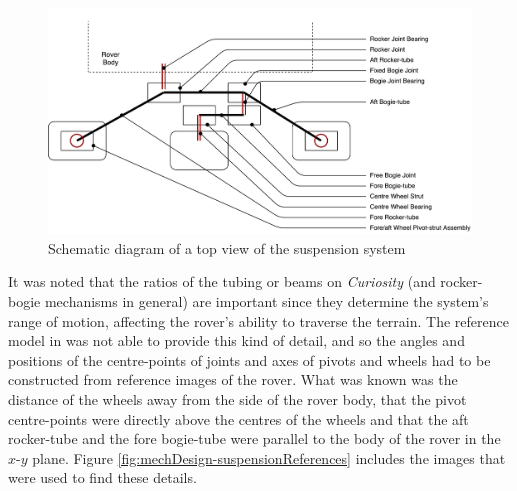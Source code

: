       \begin{figure}[h!]
        \centering
        \includegraphics[width=1\linewidth]{figures/mechDesign-suspensionLinkageMap}
        \caption[Schematic diagram of a top view of the suspension system]{Schematic diagram of a top view of the suspension system}
        \label{fig:mechdesign-suspensionLinkageMap}
      \end{figure}
      
      It was noted that the ratios of the tubing or beams on \textit{Curiosity} (and rocker-bogie mechanisms in general) are important since they determine the system's range of motion, affecting the rover's ability to traverse the terrain. The reference model in \cite{nasa3Dprint} was not able to provide this kind of detail, and so the angles and positions of the centre-points of joints and axes of pivots and wheels had to be constructed from reference images of the rover. What was known was the distance of the wheels away from the side of the rover body, that the pivot centre-points were directly above the centres of the wheels and that the aft rocker-tube and the fore bogie-tube were parallel to the body of the rover in the $x$-$y$ plane. Figure \ref{fig:mechDesign-suspensionReferences} includes the images that were used to find these details.
      
